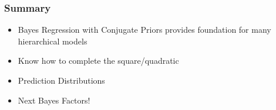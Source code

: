 \documentclass[]{beamer}
\begin{document}
\begin{frame} \frametitle{Summary}

\begin{itemize}
  \item Bayes Regression with Conjugate Priors provides foundation for many hierarchical models
  \item Know how to complete the square/quadratic
  \item Prediction Distributions
  \item Next Bayes Factors!
\end{itemize}


\end{frame}
\end{document}
